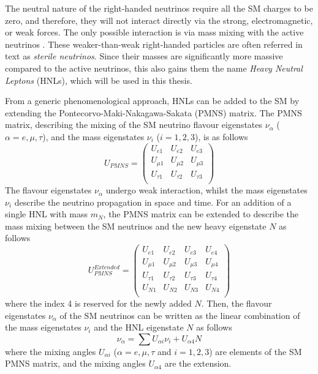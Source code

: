 The neutral nature of the right-handed neutrinos require all the SM charges to be zero, and therefore, they will not interact directly via the strong, electromagnetic, or weak forces.
The only possible interaction is via mass mixing with the active neutrinos \cite{SBNHNL}.
These weaker-than-weak right-handed particles are often referred in text as \textit{sterile neutrinos}.
Since their masses are significantly more massive compared to the active neutrinos, this also gains them the name \textit{Heavy Neutral Leptons} (HNLs), which will be used in this thesis.

From a generic phenomenological approach, HNLs can be added to the SM by extending the Pontecorvo-Maki-Nakagawa-Sakata (PMNS) matrix.
The PMNS matrix, describing the mixing of the SM neutrino flavour eigenstates $\nu_{\alpha}$ ($\alpha=e,\mu,\tau$), and the mass eigenstates $\nu_{i}$ ($i=1,2,3$), is as follows 
\begin{equation}
	U_{PMNS} =
	\begin{pmatrix}
		U_{e1} & U_{e2} & U_{e3}\\
		U_{\mu1} & U_{\mu2} & U_{\mu3}\\
		U_{\tau1} & U_{\tau2} & U_{\tau3}\\
	\end{pmatrix}
\end{equation}
The flavour eigenstates $\nu_{\alpha}$ undergo weak interaction, whilst the mass eigenstates $\nu_{i}$ describe the neutrino propagation in space and time.
For an addition of a single HNL with mass $m_{N}$, the PMNS matrix can be extended to describe the mass mixing between the SM neutrinos and the new heavy eigenstate $N$ as follows 
\begin{equation}
	U_{PMNS}^{Extended} =
	\begin{pmatrix}
		U_{e1} & U_{e2} & U_{e3} & U_{e4}\\
		U_{\mu1} & U_{\mu2} & U_{\mu3} & U_{\mu4}\\
		U_{\tau1} & U_{\tau2} & U_{\tau3} & U_{\tau4}\\
		U_{N1} & U_{N2} & U_{N3} & U_{N4}\\
	\end{pmatrix}
\end{equation}
where the index 4 is reserved for the newly added $N$.
Then, the flavour eigenstates  $\nu_{\alpha}$ of the SM neutrinos can be written as the linear combination of the mass eigenstates $\nu_{i}$ and the HNL eigenstate $N$ as follows 
\begin{equation}
	\nu_{\alpha}=\sum U_{\alpha i}\nu_{i} + U_{\alpha 4}N
\end{equation}
where the mixing angles $U_{\alpha i }$ ($\alpha=e,\mu,\tau$ and $i=1,2,3$) are elements of the SM PMNS matrix, and the mixing angles $U_{\alpha 4}$ are the extension.

